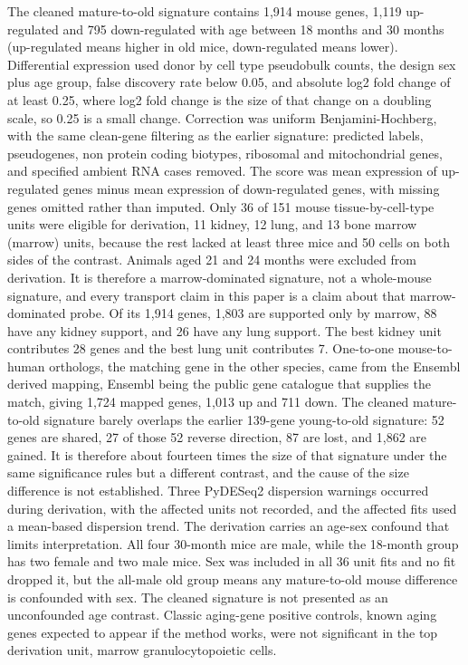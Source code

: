 \documentclass[11pt]{article}
\begin{document}
The cleaned mature-to-old signature contains 1,914 mouse genes, 1,119 up-regulated and 795 down-regulated with age between 18 months and 30 months (up-regulated means higher in old mice, down-regulated means lower). Differential expression used donor by cell type pseudobulk counts, the design sex plus age group, false discovery rate below 0.05, and absolute log2 fold change of at least 0.25, where log2 fold change is the size of that change on a doubling scale, so 0.25 is a small change. Correction was uniform Benjamini-Hochberg, with the same clean-gene filtering as the earlier signature: predicted labels, pseudogenes, non protein coding biotypes, ribosomal and mitochondrial genes, and specified ambient RNA cases removed. The score was mean expression of up-regulated genes minus mean expression of down-regulated genes, with missing genes omitted rather than imputed.
Only 36 of 151 mouse tissue-by-cell-type units were eligible for derivation, 11 kidney, 12 lung, and 13 bone marrow (marrow) units, because the rest lacked at least three mice and 50 cells on both sides of the contrast. Animals aged 21 and 24 months were excluded from derivation. It is therefore a marrow-dominated signature, not a whole-mouse signature, and every transport claim in this paper is a claim about that marrow-dominated probe. Of its 1,914 genes, 1,803 are supported only by marrow, 88 have any kidney support, and 26 have any lung support. The best kidney unit contributes 28 genes and the best lung unit contributes 7. One-to-one mouse-to-human orthologs, the matching gene in the other species, came from the Ensembl derived mapping, Ensembl being the public gene catalogue that supplies the match, giving 1,724 mapped genes, 1,013 up and 711 down.
The cleaned mature-to-old signature barely overlaps the earlier 139-gene young-to-old signature: 52 genes are shared, 27 of those 52 reverse direction, 87 are lost, and 1,862 are gained. It is therefore about fourteen times the size of that signature under the same significance rules but a different contrast, and the cause of the size difference is not established. Three PyDESeq2 dispersion warnings occurred during derivation, with the affected units not recorded, and the affected fits used a mean-based dispersion trend.
The derivation carries an age-sex confound that limits interpretation. All four 30-month mice are male, while the 18-month group has two female and two male mice. Sex was included in all 36 unit fits and no fit dropped it, but the all-male old group means any mature-to-old mouse difference is confounded with sex. The cleaned signature is not presented as an unconfounded age contrast. Classic aging-gene positive controls, known aging genes expected to appear if the method works, were not significant in the top derivation unit, marrow granulocytopoietic cells.
\end{document}
